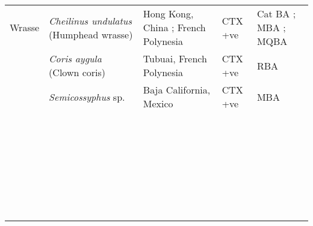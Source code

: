 \documentclass[12pt]{article}
\begin{document}
\begin{longtable}{  | p{2cm} | p{3cm} | p{4.5cm}  | p{2cm} | p{3cm}  | }
 Wrasse &  \emph{Cheilinus undulatus} (Humphead wrasse) & Hong Kong, China \cite{wong2005study,wong2009solid}; French Polynesia \cite{bagnis1987use}  & CTX +ve \cite{bagnis1987use,wong2005study,wong2009solid} & Cat BA \cite{bagnis1987use}; MBA \cite{bagnis1987use,wong2005study,wong2009solid}; MQBA \cite{bagnis1987use} \\
  & \emph{Coris aygula} (Clown coris) & Tubuai, French Polynesia \cite{darius2007ciguatera} & CTX +ve \cite{darius2007ciguatera} & RBA \cite{darius2007ciguatera} \\
  & \emph{Semicossyphus} sp. & Baja California, Mexico \cite{lechuga1995documented} & CTX +ve \cite{lechuga1995documented} & MBA \cite{lechuga1995documented}\\
  \hline
  &  \emph{} &  &  & \\
  & \emph{}  &  &  & \\
  & \emph{} &  &  & \\
  &  \emph{} &  &  & \\
  & \emph{}  &  &  & \\
  & \emph{} &  &  & \\
  &  \emph{} &  &  & \\
  & \emph{}  &  &  & \\
  & \emph{} &  &  & \\
  &  \emph{} &  &  & \\
  & \emph{}  &  &  & \\
  & \emph{} &  &  & \\
  &  \emph{} &  &  & \\
  & \emph{}  &  &  & \\
  & \emph{} &  &  & \\
  &  \emph{} &  &  & \\
  & \emph{}  &  &  & \\
  & \emph{} &  &  & \\
  &  \emph{} &  &  & \\
  & \emph{}  &  &  & \\
  & \emph{} &  &  & \\
  &  \emph{} &  &  & \\
  & \emph{}  &  &  & \\
  & \emph{} &  &  & \\
  &  \emph{} &  &  & \\
  & \emph{}  &  &  & \\
  & \emph{} &  &  & \\
  &  \emph{} &  &  & \\
  & \emph{}  &  &  & \\
  & \emph{} &  &  & \\
\end{longtable}
\end{document}
